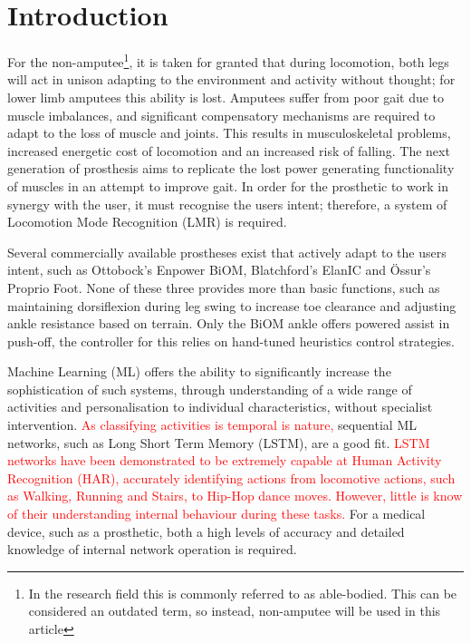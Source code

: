 \documentclass[sensors,article,submit,moreauthors,pdftex]{Definitions/mdpi}
\begin{document}


\section{Introduction}
For the non-amputee\footnote{In the research field this is commonly referred to as able-bodied. This can be considered an outdated term, so instead, non-amputee will be used in this article}, it is taken for granted that during locomotion, both legs will act in unison adapting to the environment and activity without thought; for lower limb amputees this ability is lost. Amputees suffer from poor gait due to muscle imbalances, and significant compensatory mechanisms are required to adapt to the loss of muscle and joints\cite{Silverman2008}. This results in musculoskeletal problems, increased energetic cost of locomotion and an increased risk of falling\cite{Herr2012, Piazza2017, McDonald2018}. The next generation of prosthesis aims to replicate the lost power generating functionality of muscles in an attempt to improve gait. In order for the prosthetic to work in synergy with the user, it must recognise the users intent; therefore, a system of Locomotion Mode Recognition (LMR) is required.

Several commercially available prostheses exist that actively adapt to the users intent, such as Ottobock's Enpower BiOM\cite{Enpower}, Blatchford's ElanIC\cite{ElanIC} and \"Ossur's Proprio Foot\cite{Proprio}. None of these three provides more than basic functions, such as maintaining dorsiflexion during leg swing to increase toe clearance and adjusting ankle resistance based on terrain. Only the BiOM ankle offers powered assist in push-off, the controller for this relies on hand-tuned heuristics control strategies\cite{Montgomery2018}.

Machine Learning (ML) offers the ability to significantly increase the sophistication of such systems, through understanding of a wide range of activities and personalisation to individual characteristics, without specialist intervention\cite{Labarriere2020}. \textcolor{red}{As classifying activities is temporal is nature, } sequential ML networks, such as Long Short Term Memory (LSTM), are a good fit. \textcolor{red}{LSTM networks have been demonstrated to be extremely capable at Human Activity Recognition (HAR), accurately identifying actions from locomotive actions, such as Walking, Running and Stairs\cite{Murad2017}, to Hip-Hop dance moves\cite{Samprita2020}. However, little is know of their understanding internal behaviour during these tasks.} For a medical device, such as a prosthetic, both a high levels of accuracy and detailed knowledge of internal network operation is required.
\end{document}
